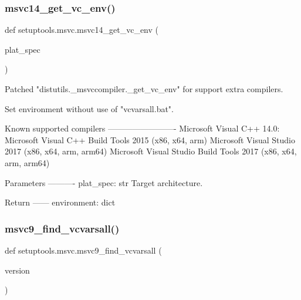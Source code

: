 \subsubsection{\texorpdfstring{msvc14\+\_\+get\+\_\+vc\+\_\+env()}{msvc14\_get\_vc\_env()}}
{\footnotesize\ttfamily def setuptools.\+msvc.\+msvc14\+\_\+get\+\_\+vc\+\_\+env (\begin{DoxyParamCaption}\item[{}]{plat\+\_\+spec }\end{DoxyParamCaption})}

\begin{DoxyVerb}Patched "distutils._msvccompiler._get_vc_env" for support extra
compilers.

Set environment without use of "vcvarsall.bat".

Known supported compilers
-------------------------
Microsoft Visual C++ 14.0:
    Microsoft Visual C++ Build Tools 2015 (x86, x64, arm)
    Microsoft Visual Studio 2017 (x86, x64, arm, arm64)
    Microsoft Visual Studio Build Tools 2017 (x86, x64, arm, arm64)

Parameters
----------
plat_spec: str
    Target architecture.

Return
------
environment: dict
\end{DoxyVerb}
 \mbox{\label{namespacesetuptools_1_1msvc_a4ee903451bc75bf16dbdd14461ed230f}} 
\subsubsection{\texorpdfstring{msvc9\+\_\+find\+\_\+vcvarsall()}{msvc9\_find\_vcvarsall()}}
{\footnotesize\ttfamily def setuptools.\+msvc.\+msvc9\+\_\+find\+\_\+vcvarsall (\begin{DoxyParamCaption}\item[{}]{version }\end{DoxyParamCaption})}

